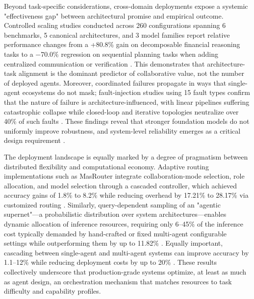 \documentclass[11pt,a4paper]{article}
\begin{document}
Beyond task-specific considerations, cross-domain deployments expose a systemic "effectiveness gap" between architectural promise and empirical outcome. Controlled scaling studies conducted across 260 configurations spanning 6 benchmarks, 5 canonical architectures, and 3 model families report relative performance changes from a +80.8\% gain on decomposable financial reasoning tasks to a $-$70.0\% regression on sequential planning tasks when adding centralized communication or verification \cite{arxiv:2512.08296v3}. This demonstrates that architecture-task alignment is the dominant predictor of collaborative value, not the number of deployed agents. Moreover, coordinated failures propagate in ways that single-agent ecosystems do not mask; fault-injection studies using 15 fault types confirm that the nature of failure is architecture-influenced, with linear pipelines suffering catastrophic collapse while closed-loop and iterative topologies neutralize over 40\% of such faults \cite{arxiv:2602.19843v1}. These findings reveal that stronger foundation models do not uniformly improve robustness, and system-level reliability emerges as a critical design requirement \cite{arxiv:2602.19843v1}.

The deployment landscape is equally marked by a degree of pragmatism between distributed flexibility and computational economy. Adaptive routing implementations such as MasRouter integrate collaboration-mode selection, role allocation, and model selection through a cascaded controller, which achieved accuracy gains of 1.8\% to 8.2\% while reducing overhead by 17.21\% to 28.17\% via customized routing \cite{arxiv:2502.11133v1}. Similarly, query-dependent sampling of an "agentic supernet"---a probabilistic distribution over system architectures---enables dynamic allocation of inference resources, requiring only 6--45\% of the inference cost typically demanded by hand-crafted or fixed multi-agent configurable settings while outperforming them by up to 11.82\% \cite{arxiv:2502.04180v2}. Equally important, cascading between single-agent and multi-agent systems can improve accuracy by 1.1--12\% while reducing deployment costs by up to 20\% \cite{arxiv:2505.18286v1}. These results collectively underscore that production-grade systems optimize, at least as much as agent design, an orchestration mechanism that matches resources to task difficulty and capability profiles.
\end{document}
